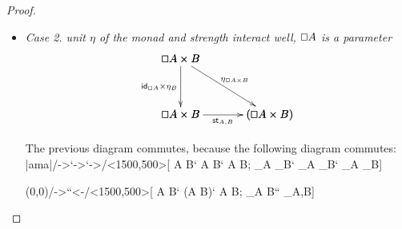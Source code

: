 \documentclass{article}
\let\Diamond\relax
\renewcommand{\Box}{\oblong}
\newcommand{\pd}[0]{\times}
\newcommand{\st}[2]{\mathsf{st}_{#1,#2}}
\newcommand{\id}[0]{\mathsf{id}}
\newcommand{\p}[1]{\mathsf{p}_{#1}}
\begin{document}
\begin{proof}
\begin{itemize}




  \item[] \textit{Case 2. unit $\eta$ of the monad and strength interact well, $\Box  A $ is a parameter}
    $$
    \bfig
    \btriangle<800,500>[
      \Box A \pd B`
      \Box A \pd \Diamond B`
      \Diamond(\Box A \pd B);
      \id_{\Box A} \pd \eta_{B}`
      \eta_{\Box A \times B}`
      \st{A}{B}]
    \efig
    $$

    The previous diagram commutes, because the following diagram commutes:
    $$
    \bfig
    \btriangle|ama|/->`->`->/<1500,500>[
      \Box A \pd B`
      \Box A \pd \Diamond B`
      \Diamond\Box A \pd \Diamond B;
      \id_{\Box A} \pd \eta_{B}`
      \eta_{\Box A} \pd \eta_B`
      \eta_{\Box A} \pd \id_{\Diamond B}]

    \qtriangle(0,0)/->``<-/<1500,500>[
      \Box A \pd B`
      \Diamond (\Box A \times B)`
      \Diamond\Box A \pd \Diamond B;
      \eta_{\Box A \times B}``
      \p{\Box A,B}]


\end{itemize}
\end{proof}
\end{document}
